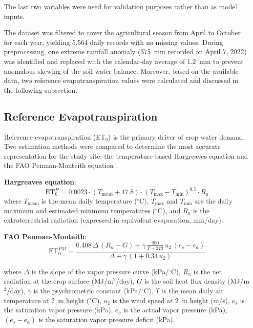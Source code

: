 The last two variables were used for validation purposes rather than as model inputs.

The dataset was filtered to cover the agricultural season from April to October for each year, yielding 5,564 daily records with no missing values. During preprocessing, one extreme rainfall anomaly (375~mm recorded on April 7, 2022) was identified and replaced with the calendar-day average of 1.2~mm to prevent anomalous skewing of the soil water balance. Moreover, based on the available data, two reference evapotranspiration values were calculated and discussed in the following subsection.

\subsection{Reference Evapotranspiration}
\label{sec:et0}

Reference evapotranspiration (ET$_0$) is the primary driver of crop water demand. Two estimation methods were compared to determine the most accurate representation for the study site: the temperature-based Hargreaves equation and the FAO Penman-Monteith equation \cite{allen1998}. 

\textbf{Hargreaves equation}: 
\begin{equation}
    \text{ET}_0^{H} = 0.0023 \cdot (T_{\text{mean}} + 17.8) \cdot (T_{\text{max}} - T_{\text{min}})^{0.5} \cdot R_a
\end{equation}
where $T_{\text{mean}}$ is the mean daily temperature ($^{\circ}$C), $T_{\max}$ and $T_{\min}$ are the daily maximum and estimated minimum temperatures ($^{\circ}$C), and $R_a$ is the extraterrestrial radiation (expressed in equivalent evaporation, mm/day).

\textbf{FAO Penman-Monteith}:
\begin{equation}
    \text{ET}_0^{PM} = \frac{0.408 \,\Delta\,(R_n - G) + \gamma \,\frac{900}{T+273}\, u_2\, (e_s - e_a)}{\Delta + \gamma\,(1 + 0.34\, u_2)}
\end{equation}

where $\Delta$ is the slope of the vapor pressure curve (kPa/$^{\circ}$C), $R_n$ is the net radiation at the crop surface (MJ/m$^2$/day), $G$ is the soil heat flux density (MJ/m$^2$/day), $\gamma$ is the psychrometric constant (kPa/$^{\circ}$C), $T$ is the mean daily air temperature at 2~m height ($^{\circ}$C), $u_2$ is the wind speed at 2~m height (m/s), $e_s$ is the saturation vapor pressure (kPa), $e_a$ is the actual vapor pressure (kPa), $(e_s - e_a)$ is the saturation vapor pressure deficit (kPa).

